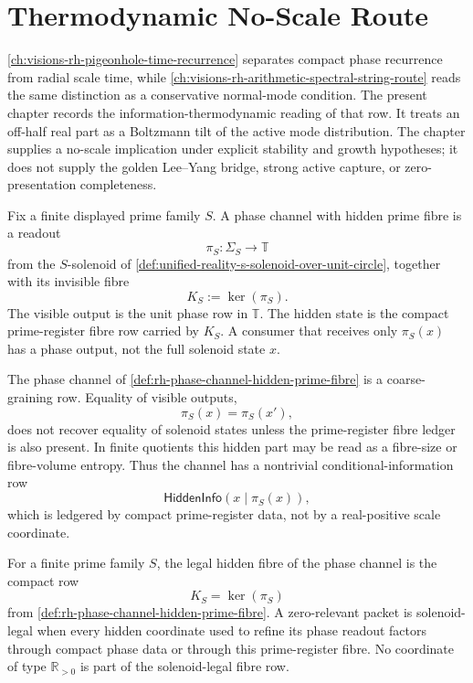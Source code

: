 \chapter{Thermodynamic No-Scale Route}
\label{ch:visions-rh-thermodynamic-no-scale-route}

\autoref{ch:visions-rh-pigeonhole-time-recurrence} separates compact
phase recurrence from radial scale time, while
\autoref{ch:visions-rh-arithmetic-spectral-string-route} reads the same
distinction as a conservative normal-mode condition.  The present chapter
records the information-thermodynamic reading of that row.  It treats an
off-half real part as a Boltzmann tilt of the active mode distribution.
The chapter supplies a no-scale implication under explicit stability and
growth hypotheses; it does not supply the golden Lee--Yang bridge, strong
active capture, or zero-presentation completeness.

\begin{definition}
\label{def:rh-phase-channel-hidden-prime-fibre}
Fix a finite displayed prime family $S$.  A phase channel with hidden
prime fibre is a readout
$$
\pi_S:\Sigma_S\to\mathbb T
$$
from the $S$-solenoid of
\autoref{def:unified-reality-s-solenoid-over-unit-circle}, together with
its invisible fibre
$$
K_S:=\ker(\pi_S).
$$
The visible output is the unit phase row in $\mathbb T$.  The hidden
state is the compact prime-register fibre row carried by $K_S$.  A
consumer that receives only $\pi_S(x)$ has a phase output, not the full
solenoid state $x$.
\end{definition}

\begin{principle}
\label{prin:rh-phase-channel-kernel-blindness}
The phase channel of
\autoref{def:rh-phase-channel-hidden-prime-fibre} is a coarse-graining
row.  Equality of visible outputs,
$$
\pi_S(x)=\pi_S(x'),
$$
does not recover equality of solenoid states unless the prime-register
fibre ledger is also present.  In finite quotients this hidden part may
be read as a fibre-size or fibre-volume entropy.  Thus the channel has a
nontrivial conditional-information row
$$
\mathsf{HiddenInfo}(x\mid \pi_S(x)),
$$
which is ledgered by compact prime-register data, not by a real-positive
scale coordinate.
\end{principle}

\begin{definition}
\label{def:rh-solenoid-legal-fibre-row}
For a finite prime family $S$, the legal hidden fibre of the phase
channel is the compact row
$$
K_S=\ker(\pi_S)
$$
from \autoref{def:rh-phase-channel-hidden-prime-fibre}.  A zero-relevant
packet is solenoid-legal when every hidden coordinate used to refine its
phase readout factors through compact phase data or through this
prime-register fibre.  No coordinate of type $\mathbb R_{>0}$ is part of
the solenoid-legal fibre row.
\end{definition}

